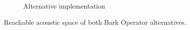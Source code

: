 \begin{figure}[ht]
\begin{subfigure}{.45\textwidth}
        \captionsetup{width=0.9\linewidth}
        \captionsetup{justification=centering}
        \caption{Alternative implementation}
    \end{subfigure}
    \captionsetup{width=0.8\linewidth}
    \captionsetup{justification=centering}
    \caption{Reachable acoustic space of both Bark Operator alternatives.}
    \label{fig:acoustic_reach}
\end{figure}